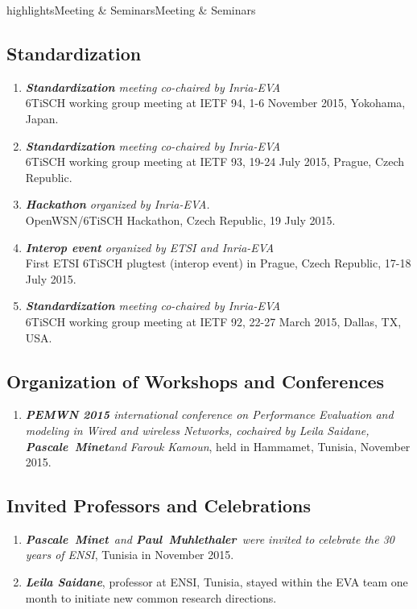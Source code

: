 \documentclass{ra2016}
\newcommand{\paul}  {\textbf{Paul~Muhlethaler}}
\newcommand{\pascale} {\textbf{Pascale~Minet}}
\begin{document}
\begin{module}{highlights}{Meeting \& Seminars}{Meeting \& Seminars}
\subsection{Standardization}
\begin{enumerate}
    \item \textit{\textbf{Standardization} meeting co-chaired by Inria-EVA}\\
        6TiSCH working group meeting at IETF 94, 1-6 November 2015, Yokohama, Japan.
    \item \textit{\textbf{Standardization} meeting co-chaired by Inria-EVA}\\
        6TiSCH working group meeting at IETF 93, 19-24 July 2015, Prague, Czech Republic.
    \item \textit{\textbf{Hackathon} organized by Inria-EVA.}\\
        OpenWSN/6TiSCH Hackathon, Czech Republic, 19 July 2015.
    \item \textit{\textbf{Interop event} organized by ETSI and Inria-EVA}\\
        First ETSI 6TiSCH plugtest (interop event) in Prague, Czech Republic, 17-18 July 2015.
    \item \textit{\textbf{Standardization} meeting co-chaired by Inria-EVA}\\
        6TiSCH working group meeting at IETF 92, 22-27 March 2015, Dallas, TX, USA.        
\end{enumerate}

\subsection{Organization of Workshops and Conferences}
\begin{enumerate}
    \item \textit{\textbf{PEMWN 2015} international conference on Performance Evaluation and modeling in Wired and wireless Networks, cochaired by Leila Saidane, \pascale and Farouk Kamoun}, held in Hammamet, Tunisia, November 2015.
\end{enumerate}

\subsection{Invited Professors and Celebrations}
\begin{enumerate}
    \item \textit{\pascale~and \paul~were invited to celebrate the 30 years of ENSI}, Tunisia in November 2015.
    \item \textit{\textbf{Leila Saidane}}, professor at ENSI, Tunisia, stayed within the EVA team one month to initiate new common research directions.
\end{enumerate} 

\end{module}
\end{document}
